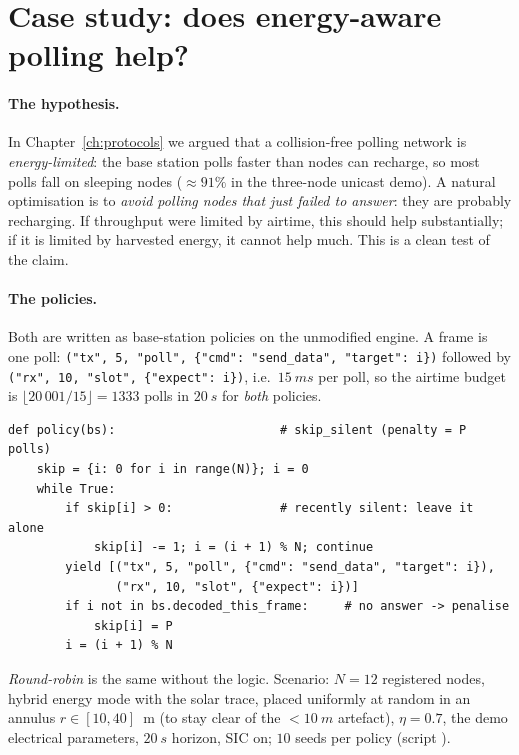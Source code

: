\section{Case study: does energy-aware polling help?}
\label{sec:pollcase}

\paragraph{The hypothesis.}
In Chapter~\ref{ch:protocols} we argued that a collision-free polling network is \emph{energy-limited}: the base station polls faster than nodes can recharge, so most polls fall on sleeping nodes ($\approx91\%$ in the three-node unicast demo). A natural optimisation is to \emph{avoid polling nodes that just failed to answer}: they are probably recharging. If throughput were limited by airtime, this should help substantially; if it is limited by harvested energy, it cannot help much. This is a clean test of the claim.

\paragraph{The policies.} Both are written as base-station policies on the unmodified engine. A frame is one poll: \texttt{("tx", 5, "poll", \{"cmd": "send\_data", "target": i\})} followed by \texttt{("rx", 10, "slot", \{"expect": i\})}, i.e.\ $\SI{15}{ms}$ per poll, so the airtime budget is $\lfloor20\,001/15\rfloor=1333$ polls in $\SI{20}{s}$ for \emph{both} policies.
\begin{lstlisting}
def policy(bs):                       # skip_silent (penalty = P polls)
    skip = {i: 0 for i in range(N)}; i = 0
    while True:
        if skip[i] > 0:               # recently silent: leave it alone
            skip[i] -= 1; i = (i + 1) % N; continue
        yield [("tx", 5, "poll", {"cmd": "send_data", "target": i}),
               ("rx", 10, "slot", {"expect": i})]
        if i not in bs.decoded_this_frame:     # no answer -> penalise
            skip[i] = P
        i = (i + 1) % N
\end{lstlisting}
\emph{Round-robin} is the same without the  logic. Scenario: $N=12$ registered nodes, hybrid energy mode with the solar trace, placed uniformly at random in an annulus $r\in[10,40]$~m (to stay clear of the $<\SI{10}{m}$ artefact), $\eta=0.7$, the demo electrical parameters, $\SI{20}{s}$ horizon, SIC on; $10$ seeds per policy (script ).


